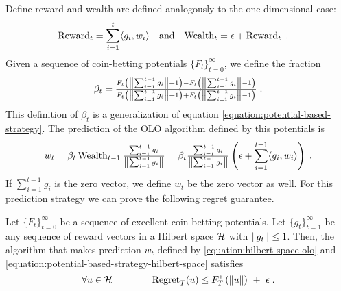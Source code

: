 Define reward and wealth are defined analogously to the one-dimensional case:
\begin{align*}
\operatorname{Reward}_t &= \sum_{i=1}^t \langle g_i, w_i \rangle &
& \text{and} &
\operatorname{Wealth}_t &= \epsilon + \operatorname{Reward}_t \; .
\end{align*}
Given a sequence of coin-betting potentials $\{F_t\}_{t=0}^\infty$,
we define the fraction
\begin{equation}
\label{equation:potential-based-strategy-hilbert-space}
\beta_t = \tfrac{F_t \left(\left\|{\sum_{i=1}^{t-1} g_i}\right\| + 1\right) - F_t\left(\left\|{\sum_{i=1}^{t-1} g_i}\right\| - 1 \right)}{F_t\left(\left\|{\sum_{i=1}^{t-1} g_i}\right\| + 1 \right) + F_t\left(\left\|{\sum_{i=1}^{t-1} g_i}\right\| - 1 \right)} \; .
\end{equation}
This definition of $\beta_t$ is a generalization of equation
\eqref{equation:potential-based-strategy}. The prediction of the OLO algorithm
defined by this potentials is
\begin{equation}
\label{equation:hilbert-space-olo}
w_t = \beta_t \operatorname{Wealth}_{t-1} \tfrac{\sum_{i=1}^{t-1} g_i}{\left\|{\sum_{i=1}^{t-1} g_i}\right\|}
= \beta_t \tfrac{\sum_{i=1}^{t-1} g_i}{\left\|{\sum_{i=1}^{t-1} g_i}\right\|} \left(\epsilon+ \sum_{i=1}^{t-1} \langle g_i, w_i\rangle \right) \; .
\end{equation}
If $\sum_{i=1}^{t-1}
g_i$ is the zero vector, we define $w_t$ be the zero vector as well.
For this prediction strategy we can prove the following regret guarantee.
%
\begin{theorem}
\label{theorem:hilbert-space-olo-regret-bound}
Let $\{F_t\}_{t=0}^\infty$ be a sequence of excellent coin-betting potentials.
Let $\{g_t\}_{t=1}^\infty$ be any sequence of reward vectors in a Hilbert space
$\mathcal{H}$ with $\left\|{g_t}\right\| \le 1$. Then, the algorithm that makes
prediction $w_t$ defined by \eqref{equation:hilbert-space-olo} and
\eqref{equation:potential-based-strategy-hilbert-space} satisfies
$$
\forall u \in \mathcal{H} \qquad \qquad
\operatorname{Regret}_T(u) \le F_T^*\left(\left\|{u}\right\| \right) \ + \ \epsilon \; .
$$
\end{theorem}

